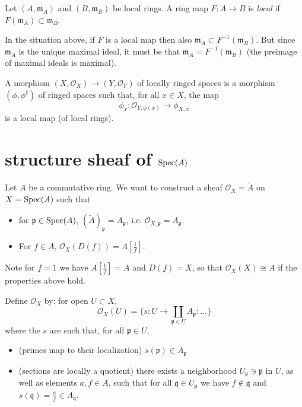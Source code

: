 \documentclass[12pt]{article}
\begin{document}
\begin{definition}
	Let $(A,\mathfrak{m}_A)$ and $(B,\mathfrak{m}_B)$ be local rings. A ring map $F:A\to B$ is \emph{local} if $F(\mathfrak{m}_A)\subset\mathfrak{m}_B$.
\end{definition}

\begin{remark}
	In the situation above, if $F$ is a local map then also $\mathfrak{m}_A\subset F^{-1}(\mathfrak{m}_B)$. But since $\mathfrak{m}_A$ is the unique maximal ideal, it must be that $\mathfrak{m}_A=F^{-1}(\mathfrak{m}_B)$ (the preimage of maximal ideals is maximal).
\end{remark}

\begin{definition}
	A morphism $(X,\mathcal{O}_X)\to (Y,\mathcal{O}_Y)$ of locally ringed spaces is a morphism $(\phi,\phi^\sharp)$ of ringed spaces such that, for all $x\in X$, the map 
	\begin{equation*}
		\phi_x:\mathcal{O}_{Y,\phi(x)}\to\phi_{X,x}
	\end{equation*}
	is a local map (of local rings).
\end{definition}



\section{structure sheaf of $\text{Spec}(A)$} %

Let $A$ be a commutative ring. We want to construct a sheaf $\mathcal{O}_X=\tilde{A}$ on $X=\text{Spec}(A)$ such that 
\begin{itemize}
	\item for $\mathfrak{p}\in\text{Spec}(A)$, $(\tilde{A})_\mathfrak{p}=A_\mathfrak{p}$, i.e. $\mathcal{O}_{X,\mathfrak{p}}=A_\mathfrak{p}$.
	\item For $f\in A$, $\mathcal{O}_X(D(f))=A[\frac{1}{f}]$.
\end{itemize}
Note for $f=1$ we have $A[\frac{1}{f}]=A$ and $D(f)=X$, so that $\mathcal{O}_X(X)\cong A$ if the properties above hold.

\begin{definition}
	Define $\mathcal{O}_X$ by: for open $U\subset X$,
	\begin{equation*}
		\mathcal{O}_X(U) = \{ s: U\to \coprod_{\mathfrak{p}\in U}A_\mathfrak{p} : \dots\}
	\end{equation*}
	where the $s$ are such that, for all $\mathfrak{p}\in U$,
	\begin{itemize}
		\item (primes map to their localization) $s(\mathfrak{p})\in A_\mathfrak{p}$
		\item (sections are locally a quotient) there exists a neighborhood $U_\mathfrak{p}\ni\mathfrak{p}$ in $U$, as well as elements $a,f\in A$, such that for all $\mathfrak{q}\in U_\mathfrak{p}$ we have $f\not\in\mathfrak{q}$ and $s(\mathfrak{q})=\frac{a}{f}\in A_\mathfrak{q}$.
	\end{itemize}
\end{definition}
\end{document}
